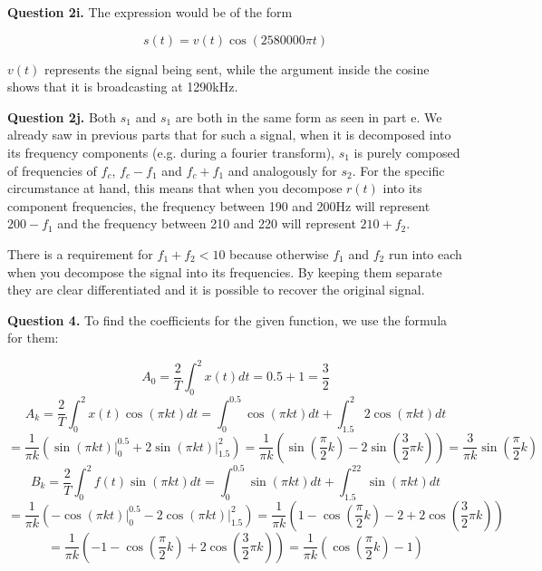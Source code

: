 \documentclass[letterpaper, reqno,11pt]{article}
\begin{document}
{\noindent\bf Question 2i.} The expression would be of the form 

$$
    s(t)=v(t)\cos(2580000\pi t)
$$

$v(t)$ represents the signal being sent, while the argument inside the cosine shows that it is broadcasting at 1290kHz. 

{\noindent\bf Question 2j.} Both $s_1$ and $s_1$ are both in the same form as seen in part e. We already saw in previous parts that for such a signal, when it is decomposed into its frequency components (e.g. during a fourier transform), $s_1$ is purely composed of frequencies of $f_c$, $f_c-f_1$ and $f_c+f_1$ and analogously for $s_2$. For the specific circumstance at hand, this means that when you decompose $r(t)$ into its component frequencies, the frequency between 190 and 200Hz will represent $200-f_1$ and the frequency between 210 and 220 will represent $210+f_2$. 

There is a requirement for $f_1+f_2<10$ because otherwise $f_1$ and $f_2$ run into each when you decompose the signal into its frequencies. By keeping them separate they are clear differentiated and it is possible to recover the original signal. 

{\noindent\bf Question 4.} To find the coefficients for the given function, we use the formula for them: 

$$
    A_0=\frac2T\int_0^{2}x(t)dt={0.5+1}=\frac32
$$
$$
    A_k=\frac2T\int_0^{2}x(t)\cos(\pi kt)dt=\int_0^{0.5}\cos(\pi kt)dt+\int_{1.5}^{2}2\cos(\pi kt)dt
$$
$$
    =\frac{1}{\pi k}(\sin(\pi kt)\bigg|_0^{0.5}+2\sin(\pi kt)\bigg|_{1.5}^2)=\frac{1}{\pi k}(\sin(\frac\pi2k)-2\sin(\frac32\pi k))=\frac{3}{\pi k}\sin(\frac\pi2k)
$$
$$
    B_k=\frac2T\int_0^2f(t)\sin(\pi kt)dt=\int_0^{0.5}\sin(\pi kt)dt+\int_{1.5}^22\sin(\pi kt)dt
$$
$$
    =\frac{1}{\pi k}(-\cos(\pi kt)\bigg|_0^{0.5}-2\cos(\pi kt)\bigg|_{1.5}^2)=\frac1{\pi k}(1-\cos(\frac\pi2k)-2+2\cos(\frac32\pi k))
$$
$$
    =\frac{1}{\pi k}(-1-\cos(\frac\pi2k)+2\cos(\frac32\pi k))=\frac1{\pi k}(\cos(\frac\pi2 k)-1)
$$
\end{document}
